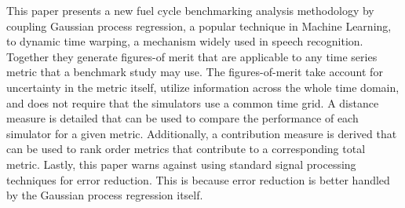 This paper presents a new fuel cycle benchmarking analysis methodology
by coupling Gaussian process regression, a popular technique in Machine 
Learning, to dynamic time warping, a mechanism widely used in speech 
recognition. Together they generate figures-of merit that are applicable to
any time series metric that a benchmark study may use. The figures-of-merit
take account for uncertainty in the metric itself, utilize information
across the whole time domain, and does not require that the simulators
use a common time grid. A distance measure is detailed that can be used to 
compare the performance of each simulator for a given metric. Additionally, 
a contribution measure is derived that can be used to rank order metrics
that contribute to a corresponding total metric. Lastly, this paper 
warns against using standard signal processing techniques for error reduction.
This is because error reduction is better handled by the Gaussian process 
regression itself.
